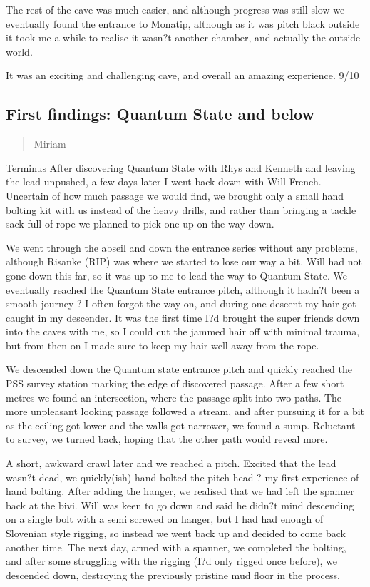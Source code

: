 \documentclass[onecolumn]{book}
\begin{document}
The rest of the cave was much easier, and although progress was still slow we eventually found the entrance to Monatip, although as it was pitch black outside it took me a while to realise it wasn?t another chamber, and actually the outside world. 

It was an exciting and challenging cave, and overall an amazing experience. 9/10

\subsection{First findings: Quantum State and below}
 \begin{verse}
Miriam
\end{verse}
Terminus
After discovering Quantum State with Rhys and Kenneth and leaving the lead unpushed, a few days later I went back down with Will French. 
Uncertain of how much passage we would find, we brought only a small hand bolting kit with us instead of the heavy drills, and rather than bringing a tackle sack full of rope we planned to pick one up on the way down. 

We went through the abseil and down the entrance series without any problems, although Risanke (RIP) was where we started to lose our way a bit. Will had not gone down this far, so it was up to me to lead the way to Quantum State. We eventually reached the Quantum State entrance pitch, although it hadn?t been a smooth journey ? I often forgot the way on, and during one descent my hair got caught in my descender. It was the first time I?d brought the super friends down into the caves with me, so I could cut the jammed hair off with minimal trauma, but from then on I made sure to keep my hair well away from the rope.

We descended down the Quantum state entrance pitch and quickly reached the PSS survey station marking the edge of discovered passage. After a few short metres we found an intersection, where the passage split into two paths. The more unpleasant looking passage followed a stream, and after pursuing it for a bit as the ceiling got lower and the walls got narrower, we found a sump. Reluctant to survey, we turned back, hoping that the other path would reveal more. 

A short, awkward crawl later and we reached a pitch. Excited that the lead wasn?t dead, we quickly(ish) hand bolted the pitch head ? my first experience of hand bolting. After adding the hanger, we realised that we had left the spanner back at the bivi. Will was keen to go down and said he didn?t mind descending on a single bolt with a semi screwed on hanger, but I had had enough of Slovenian style rigging, so instead we went back up and decided to come back another time.
The next day, armed with a spanner, we completed the bolting, and after some struggling with the rigging (I?d only rigged once before), we descended down, destroying the previously pristine mud floor in the process. 
\end{document}
